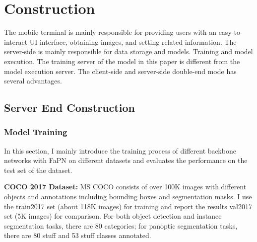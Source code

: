 
\section{Construction}
The mobile terminal is mainly responsible for providing users with an easy-to-interact UI interface, obtaining images, and setting related information. 
The server-side is mainly responsible for data storage and models. Training and model execution. The training server of the model in this paper is different from the model execution server. The client-side and server-side double-end mode has several advantages.


\subsection{Server End Construction}

\subsubsection{Model Training}


In this section, I mainly introduce the training process of different backbone networks with FaPN on different datasets and evaluates the performance on the test set of the dataset.

\textbf{COCO 2017 Dataset: }MS COCO \cite{lin2014microsoft} consists of over 100K images with different objects and annotations including bounding boxes and segmentation masks. I use the train2017 set (about 118K images) for training and report the results val2017 set (5K images) for comparison. For both object detection and instance segmentation tasks, there are 80 categories; for panoptic segmentation tasks, there are 80 stuff and 53 stuff classes annotated.


